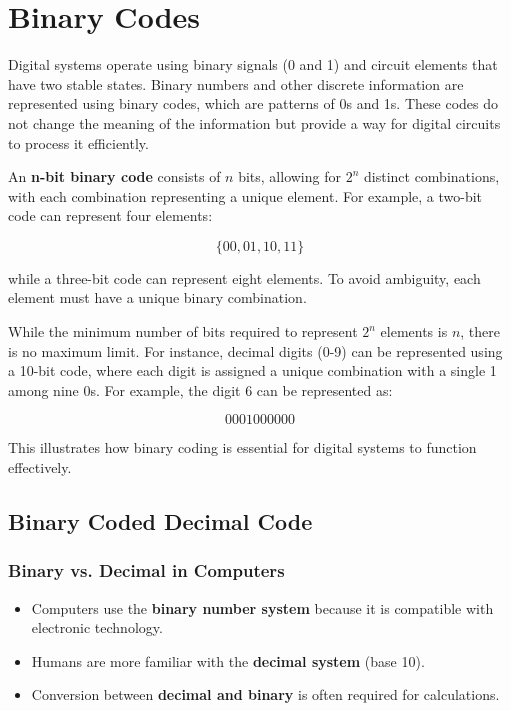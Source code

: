 \documentclass[a4paper,12pt]{article}
\begin{document}
\newpage
    
\section{Binary Codes}

Digital systems operate using binary signals (0 and 1) and circuit elements that have two stable states. Binary numbers and other discrete information are represented using binary codes, which are patterns of 0s and 1s. These codes do not change the meaning of the information but provide a way for digital circuits to process it efficiently.

An \textbf{n-bit binary code} consists of $n$ bits, allowing for $2^n$ distinct combinations, with each combination representing a unique element. For example, a two-bit code can represent four elements:

\[
\{00, 01, 10, 11\}
\]

while a three-bit code can represent eight elements. To avoid ambiguity, each element must have a unique binary combination.

While the minimum number of bits required to represent $2^n$ elements is $n$, there is no maximum limit. For instance, decimal digits (0-9) can be represented using a 10-bit code, where each digit is assigned a unique combination with a single 1 among nine 0s. For example, the digit 6 can be represented as:

\[
0001000000
\]

This illustrates how binary coding is essential for digital systems to function effectively.

\subsection{Binary Coded Decimal Code}
\subsubsection{Binary vs. Decimal in Computers}
\begin{itemize}
    \item Computers use the \textbf{binary number system} because it is compatible with electronic technology.
    \item Humans are more familiar with the \textbf{decimal system} (base 10).
    \item Conversion between \textbf{decimal and binary} is often required for calculations.
\end{itemize}
\end{document}
